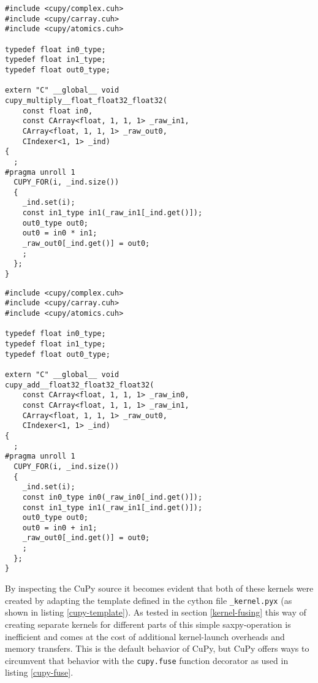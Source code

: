 \documentclass[english,11pt,a4paper,table]{article} %
\begin{document}
\begin{minipage}[t]{.48\textwidth}
	\begin{verbatim}
#include <cupy/complex.cuh>
#include <cupy/carray.cuh>
#include <cupy/atomics.cuh>

typedef float in0_type;
typedef float in1_type;
typedef float out0_type;

extern "C" __global__ void 
cupy_multiply__float_float32_float32(
	const float in0,
	const CArray<float, 1, 1, 1> _raw_in1,
	CArray<float, 1, 1, 1> _raw_out0,
	CIndexer<1, 1> _ind)
{
  ;
#pragma unroll 1
  CUPY_FOR(i, _ind.size())
  {
    _ind.set(i);
    const in1_type in1(_raw_in1[_ind.get()]);
    out0_type out0;
    out0 = in0 * in1;
    _raw_out0[_ind.get()] = out0;
    ;
  };
}
\end{verbatim}
\end{minipage}\hfill%
\begin{minipage}[t]{.48\textwidth}
	\begin{verbatim}
#include <cupy/complex.cuh>
#include <cupy/carray.cuh>
#include <cupy/atomics.cuh>

typedef float in0_type;
typedef float in1_type;
typedef float out0_type;

extern "C" __global__ void 
cupy_add__float32_float32_float32(
	const CArray<float, 1, 1, 1> _raw_in0,
	const CArray<float, 1, 1, 1> _raw_in1,
	CArray<float, 1, 1, 1> _raw_out0, 
	CIndexer<1, 1> _ind)
{
  ;
#pragma unroll 1
  CUPY_FOR(i, _ind.size())
  {
    _ind.set(i);
    const in0_type in0(_raw_in0[_ind.get()]);
    const in1_type in1(_raw_in1[_ind.get()]);
    out0_type out0;
    out0 = in0 + in1;
    _raw_out0[_ind.get()] = out0;
    ;
  };
}
\end{verbatim}
\end{minipage}%

By inspecting the CuPy source it becomes evident that both of these kernels were created by adapting the template defined in the cython file \texttt{\_kernel.pyx} \cite[lines 47-73]{cupykern44:online} (as shown in listing \ref{cupy-template}).
As tested in section \ref{kernel-fusing} this way of creating separate kernels for different parts of this simple saxpy-operation is inefficient and comes at the cost of additional kernel-launch overheads and memory transfers.
This is the default behavior of CuPy, but CuPy offers ways to circumvent that behavior with the \texttt{cupy.fuse} function decorator as used in listing \ref{cupy-fuse}.
\end{document}
